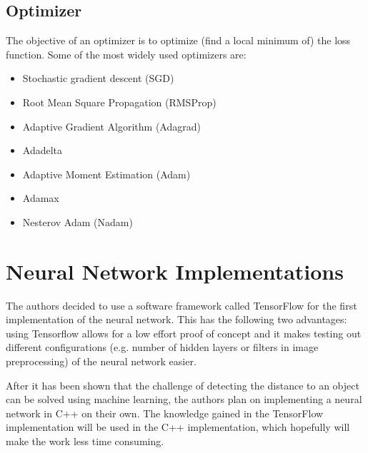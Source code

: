 
\subsection{Optimizer}
The objective of an optimizer is to optimize (find a local minimum of) the loss function. Some of the most widely used optimizers are:

\begin{itemize}
	\item Stochastic gradient descent (SGD)
	\item Root Mean Square Propagation (RMSProp)
	\item Adaptive Gradient Algorithm (Adagrad)
	\item Adadelta
	\item Adaptive Moment Estimation (Adam)
	\item Adamax
	\item Nesterov Adam (Nadam)
\end{itemize}

\section{Neural Network Implementations}
The authors decided to use a software framework called TensorFlow for the first implementation of the neural network. This has the following two advantages: using Tensorflow allows for a low effort proof of concept and it makes testing out different configurations (e.g. number of hidden layers or filters in image preprocessing) of the neural network easier.

After it has been shown that the challenge of detecting the distance to an object can be solved using machine learning, the authors plan on implementing a neural network in C++ on their own. The knowledge gained in the TensorFlow implementation will be used in the C++ implementation, which hopefully will make the work less time consuming.

